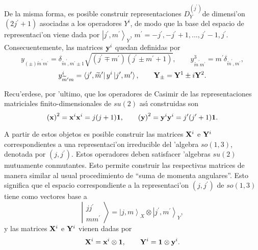 De la misma forma, es posible construir representaciones $D_{Y}^{(j^{\prime
})}$de dimensi'on $(2j^{\prime }+1)$ asociadas a los operadores $Y^{i}$,
de modo que la base del espacio de representaci'on viene dada por $\left|
j^{\prime },m^{\prime }\right\rangle _{Y}$, $m^{\prime }=-j^{\prime
},-j^{\prime }+1,\ldots ,j^{\prime }-1,j^{\prime }$. Consecuentemente, las
matrices ${\bf y}^{i}$ quedan definidas por 
\begin{equation}
y_{(\pm )\widetilde{m}^{\prime }m^{\prime }}=\delta _{\widetilde{m}^{\prime
},m^{\prime }\pm 1}\sqrt{\left( j^{\prime }\mp m^{\prime }\right) \left(
j^{\prime }\pm m^{\prime }+1\right) },\qquad y_{\widetilde{m}^{\prime
}m^{\prime }}^3=m^{\prime }\delta _{\widetilde{m}^{\prime },m^{\prime }},
\label{y1}
\end{equation}
\begin{equation}
y_{\widetilde{m}^{\prime }m}^{i}=\left\langle j^{\prime },\widetilde{m}%
^{\prime }\right| y^{i}\left| j^{\prime },m^{\prime }\right\rangle ,\qquad 
{\bf Y}_{\pm }={\bf Y}^1\pm i{\bf Y}^2.  \label{y2}
\end{equation}

Recu'erdese, por 'ultimo, que los operadores de Casimir de las
representaciones matriciales finito-dimensionales de $su(2)$ as{\'\i}
construidas son 
\begin{equation}
\left( {\bf x}\right) ^2={\bf x}^{i}{\bf x}^{i}=j(j+1){\bf 1},\qquad
\left( {\bf y}\right) ^2={\bf y}^{i}{\bf y}^{i}=j^{\prime }(j^{\prime }+1)%
{\bf 1}. 
\end{equation}

A partir de estos objetos es posible construir las matrices ${\bf X}^{i}$ e $%
{\bf Y}^{i}$ correspondientes a una representaci'on irreducible del
'algebra $so(1,3)$, denotada por $(j,j^{\prime })$. Estos operadores
deben satisfacer 'algebras $su(2)$ mutuamente conmutantes. Esto permite
construir las respectivas matrices de manera similar al usual procedimiento
de ``suma de momenta angulares''. Esto significa que el espacio
correspondiente a la representaci'on $(j,j^{\prime })$ de $so(1,3)$ tiene
como vectores base a 
\begin{equation}
\left| 
\begin{array}{c}
jj^{\prime } \\ 
mm^{\prime }
\end{array}
\right\rangle =\left| j,m\right\rangle _{X}\otimes \left| j^{\prime
},m^{\prime }\right\rangle _{Y}, 
\end{equation}
y las matrices ${\bf X}^{i}$ e ${\bf Y}^{i}$ vienen dadas por 
\begin{equation}
{\bf X}^{i}={\bf x}^{i}\otimes {\bf 1},\qquad {\bf Y}^{i}={\bf 1}\otimes 
{\bf y}^{i}.  \label{mayus}
\end{equation}

